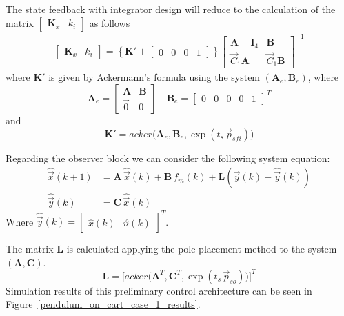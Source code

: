 \documentclass[12pt,a4paper,oneside]{book}
\begin{document}
\begin{onehalfspace}
The state feedback with integrator design will reduce to the calculation of the matrix $\begin{bmatrix}
	\mathbf{K}_x & k_i
\end{bmatrix}$ as follows
\begin{equation}
	\begin{aligned}
		\begin{bmatrix} 
			\mathbf{K}_x & k_i
		\end{bmatrix} = \left\lbrace \mathbf{K'}+
		\begin{bmatrix} 
			0&0&0&1
		\end{bmatrix}\right\rbrace 
		\begin{bmatrix} 
			\mathbf{A}-\mathbf{I}_4 & \mathbf{B}  \\[6pt] 
			\vec{C}_1\mathbf{A} & \vec{C}_1\mathbf{B} 
		\end{bmatrix}^{-1}
	\end{aligned}
\end{equation}
where $\mathbf{K'}$ is given by Ackermann's formula using the system 
$(\mathbf{A}_e,\mathbf{B}_e)$, where
\begin{equation}
	\mathbf{A}_e = \begin{bmatrix} \mathbf{A} & \mathbf{B} \\[6pt] \vec{0} & 
		0\end{bmatrix} \quad 
	\mathbf{B}_e = \begin{bmatrix} 0&0&0&0&1\end{bmatrix}^T
\end{equation}
and 
\begin{equation}
	\mathbf{K'} = 
	acker\Big(\mathbf{A}_e,\mathbf{B}_e,\exp(t_s\,\vec{p}_{sfi})\Big)
\end{equation}

Regarding the observer block we can consider the following system equation:
\begin{equation}
	\begin{aligned}
		\hat{\vec{x}}(k+1)  &= \mathbf{A} \,\hat{\vec{x}}(k) +\mathbf{B} 
		\,f_m(k)+\mathbf{L} \left( \vec{y}(k) - \hat{\vec{y}}(k) \right)  
		\\[6pt]
		\hat{\vec{y}}(k)  &= \mathbf{C} \,\hat{\vec{x}}(k)
	\end{aligned}
\end{equation}
Where $\hat{\vec{y}}(k)=\begin{bmatrix}
	\hat{x}(k) & \hat{\vartheta}(k)
\end{bmatrix}^T$.

The matrix $\mathbf{L}$ is calculated applying the pole placement method to the 
system $(\mathbf{A},\mathbf{C})$.
\begin{equation}
	\mathbf{L} = 
	\Bigg[acker\Big(\mathbf{A}^T,\mathbf{C}^T,\exp(t_s\,\vec{p}_{so})\Big)\Bigg]^T
\end{equation}
Simulation results of this preliminary control architecture can be seen in Figure~\ref{pendulum_on_cart_case_1_results}.


\end{onehalfspace}
\end{document}
